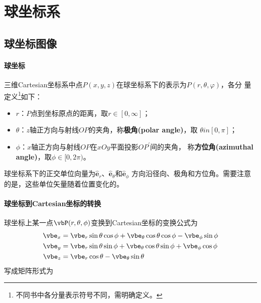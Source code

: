 \section{球坐标系}

\subsection{球坐标图像}
\paragraph*{球坐标}
三维Cartesian坐标系中点$P(x, y, z)$在球坐标系下的表示为$P(r, \theta, \varphi)$，各分
量定义\footnote{不同书中各分量表示符号不同，需明确定义。}如下：
\begin{itemize}
    \item $r$：$P$点到坐标原点的距离，取$r \in [0, \infty]$；
    \item $\theta$：$z$轴正方向与射线$OP$的夹角，称\textbf{极角(polar angle)}，取
                    $\theta in [0, \pi]$；
    \item $\phi$：$x$轴正方向与射线$OP$在$xOy$平面投影$OP^{\prime}$间的夹角，
                  称\textbf{方位角(azimuthal angle)}，取$\phi \in [0, 2\pi)$。
\end{itemize}
球坐标系下的正交单位向量为$\hat{\bm{e}}_r$、$\hat{\bm{e}}_\theta$和$\hat{\bm{e}}_\phi$
方向沿径向、极角和方位角。需要注意的是，这些单位矢量随着位置变化的。

\paragraph*{球坐标到Cartesian坐标的转换}
球坐标上某一点$\vbP(r, \theta, \phi)$变换到Cartesian坐标的变换公式为
\begin{equation}
    \begin{aligned}
        \vbe_{x} 
       &= \vbe_{r}\sin\theta\cos\phi + \vbe_{\theta}\cos\theta\cos\phi - \vbe_{\phi}\sin{\phi} \\
        \vbe_{y} 
       &= \vbe_{r}\sin\theta\sin\phi + \vbe_{\theta}\cos\theta\sin\phi + \vbe_{\phi}\cos{\phi} \\
        \vbe_{z} 
       &= \vbe_{r}\cos\theta - \vbe_{\theta}\sin\theta
    \end{aligned}
    \label{eq:sphere-to-cartesian}
\end{equation}
写成矩阵形式为


